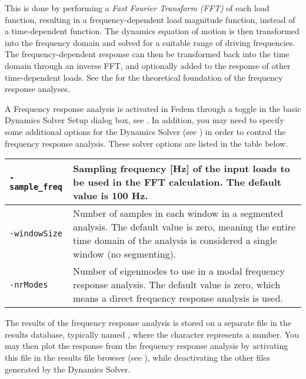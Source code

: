 This is done by performing a {\sl Fast Fourier Transform (FFT)} of each load
function, resulting in a frequency-dependent load magnitude function, instead of
a time-dependent function. The dynamics equation of motion is then transformed
into the frequency domain and solved for a suitable range of driving
frequencies. The frequency-dependent response can then be transformed back into
the time domain through an inverse FFT, and optionally added to the response of
other time-dependent loads.
See the 
for the theoretical foundation of the frequency response analyses.

A Frequency response analysis is activated in Fedem through a toggle in
the basic Dynamics Solver Setup dialog box, see
.
In addition, you may need to specify some additional options for the Dynamics
Solver (see )
in order to control the frequency response analysis.
These solver options are listed in the table below.

\noindent
\begin{tabular}{ | m{22mm} | m{9cm}| }
  \hline{\tt-sample\_freq} &
  Sampling frequency [Hz] of the input loads to be used in the FFT calculation.
  The default value is 100 Hz. \\

  \hline{\tt-windowSize} &
  Number of samples in each window in a segmented analysis.
  The default value is zero, meaning the entire time domain of the analysis
  is considered a single window (no segmenting). \\

  \hline{\tt-nrModes} &
  Number of eigenmodes to use in a modal frequency response analysis.
  The default value is zero, which means a direct frequency response analysis
  is used. \\
  \hline
\end{tabular}

The results of the frequency response analysis is stored on a separate
 file in the results database, typically named ,
where the \File{\#} character represents a number.
You may then plot the response from the frequency response analysis by
activating this file in the results file browser (see
),
while deactivating the other  files generated by the Dynamics Solver.


